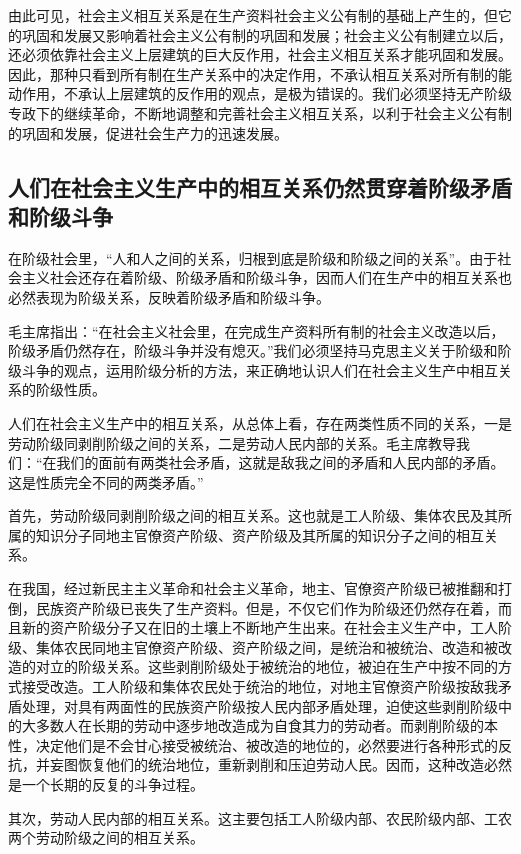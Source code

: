 \documentclass{book}
\begin{document}
由此可见，社会主义相互关系是在生产资料社会主义公有制的基础上产生的，但它的巩固和发展又影响着社会主义公有制的巩固和发展；社会主义公有制建立以后，还必须依靠社会主义上层建筑的巨大反作用，社会主义相互关系才能巩固和发展。因此，那种只看到所有制在生产关系中的决定作用，不承认相互关系对所有制的能动作用，不承认上层建筑的反作用的观点，是极为错误的。我们必须坚持无产阶级专政下的继续革命，不断地调整和完善社会主义相互关系，以利于社会主义公有制的巩固和发展，促进社会生产力的迅速发展。

\subsection{人们在社会主义生产中的相互关系仍然贯穿着阶级矛盾和阶级斗争}

在阶级社会里，“人和人之间的关系，归根到底是阶级和阶级之间的关系”。由于社会主义社会还存在着阶级、阶级矛盾和阶级斗争，因而人们在生产中的相互关系也必然表现为阶级关系，反映着阶级矛盾和阶级斗争。

毛主席指出：“在社会主义社会里，在完成生产资料所有制的社会主义改造以后，阶级矛盾仍然存在，阶级斗争并没有熄灭。”我们必须坚持马克思主义关于阶级和阶级斗争的观点，运用阶级分析的方法，来正确地认识人们在社会主义生产中相互关系的阶级性质。

人们在社会主义生产中的相互关系，从总体上看，存在两类性质不同的关系，一是劳动阶级同剥削阶级之间的关系，二是劳动人民内部的关系。毛主席教导我们：“在我们的面前有两类社会矛盾，这就是敌我之间的矛盾和人民内部的矛盾。这是性质完全不同的两类矛盾。”

首先，劳动阶级同剥削阶级之间的相互关系。这也就是工人阶级、集体农民及其所属的知识分子同地主官僚资产阶级、资产阶级及其所属的知识分子之间的相互关系。

在我国，经过新民主主义革命和社会主义革命，地主、官僚资产阶级已被推翻和打倒，民族资产阶级已丧失了生产资料。但是，不仅它们作为阶级还仍然存在着，而且新的资产阶级分子又在旧的土壤上不断地产生出来。在社会主义生产中，工人阶级、集体农民同地主官僚资产阶级、资产阶级之间，是统治和被统治、改造和被改造的对立的阶级关系。这些剥削阶级处于被统治的地位，被迫在生产中按不同的方式接受改造。工人阶级和集体农民处于统治的地位，对地主官僚资产阶级按敌我矛盾处理，对具有两面性的民族资产阶级按人民内部矛盾处理，迫使这些剥削阶级中的大多数人在长期的劳动中逐步地改造成为自食其力的劳动者。而剥削阶级的本性，决定他们是不会甘心接受被统治、被改造的地位的，必然要进行各种形式的反抗，并妄图恢复他们的统治地位，重新剥削和压迫劳动人民。因而，这种改造必然是一个长期的反复的斗争过程。

其次，劳动人民内部的相互关系。这主要包括工人阶级内部、农民阶级内部、工农两个劳动阶级之间的相互关系。
\end{document}
